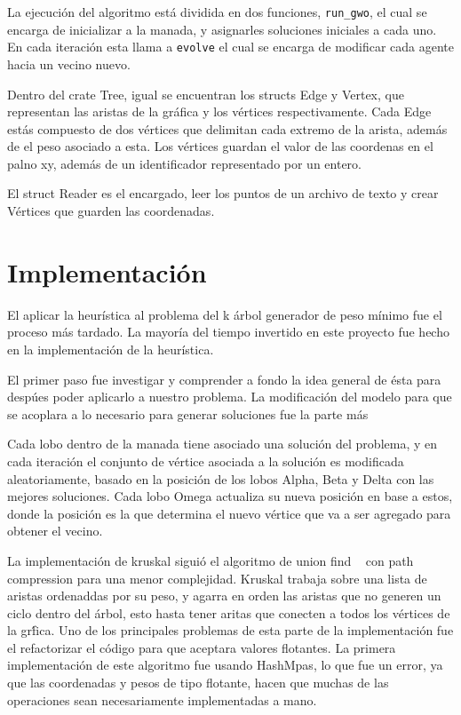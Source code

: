 \documentclass[a4paper]{report}
\begin{document}
La ejecuci\'on del algoritmo est\'a dividida en dos funciones, \texttt{run\_gwo}, el cual se encarga de
inicializar a la manada, y asignarles soluciones iniciales a cada uno. En cada iteraci\'on esta llama
a \texttt{evolve} el cual se encarga de modificar cada agente hacia un vecino nuevo.

Dentro del crate Tree, igual se encuentran los structs Edge y Vertex, que representan las aristas de
la gr\'afica y los v\'ertices respectivamente. Cada Edge est\'as compuesto de dos v\'ertices que
delimitan cada extremo de la arista, adem\'as de el peso asociado a esta. Los v\'ertices guardan el
valor de las coordenas en el palno xy, adem\'as de un identificador representado por un entero.

El struct Reader es el encargado, leer los puntos de un archivo de texto y crear V\'ertices que
guarden las coordenadas. 



\section*{Implementaci\'on}
El aplicar la heur\'istica al problema del k \'arbol generador de peso m\'inimo fue el proceso m\'as
tardado. La mayor\'ia del tiempo invertido en este proyecto fue hecho en la implementaci\'on de la
heur\'istica.

El primer paso fue investigar y comprender a fondo la idea general de \'esta para desp\'ues poder
aplicarlo a nuestro problema. La modificaci\'on del modelo para que se acoplara a lo necesario para
generar soluciones fue la parte m\'as 

 Cada lobo dentro de la manada tiene
asociado una soluci\'on del problema, y en cada iteraci\'on el conjunto de v\'ertice asociada a la
soluci\'on es modificada aleatoriamente, basado en la posici\'on de los lobos Alpha, Beta y Delta con las mejores soluciones. Cada lobo Omega actualiza su nueva posici\'on en base a estos, donde la
posici\'on es la que determina el nuevo v\'ertice que va a ser agregado para obtener el vecino.


La implementaci\'on de kruskal sigui\'o el algoritmo de union find ~\cite{unionFind} con path compression para una menor complejidad. Kruskal trabaja sobre una lista de aristas ordenaddas por su peso, y agarra en orden las aristas que no generen un ciclo dentro del \'arbol, esto hasta tener aritas que
conecten a todos los v\'ertices de la gr\'fica. Uno de los principales problemas de esta
parte de la implementaci\'on fue el refactorizar el c\'odigo para que aceptara valores flotantes. La primera implementaci\'on de este algoritmo fue usando HashMpas, lo que fue un error, ya que las
coordenadas y pesos de tipo flotante, hacen que muchas de las operaciones sean necesariamente implementadas a mano. 
\end{document}
